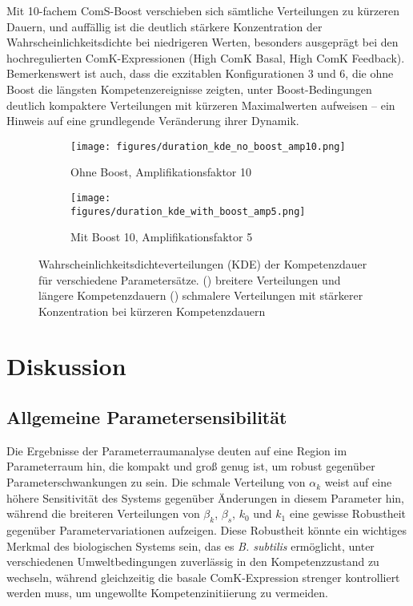 \documentclass[11pt]{article}
\begin{document}
Mit 10-fachem ComS-Boost verschieben sich sämtliche Verteilungen zu kürzeren Dauern, und auffällig ist die deutlich stärkere Konzentration der Wahrscheinlichkeitsdichte bei niedrigeren Werten, besonders ausgeprägt bei den hochregulierten ComK-Expressionen (High ComK Basal, High ComK Feedback). Bemerkenswert ist auch, dass die exzitablen Konfigurationen 3 und 6, die ohne Boost die längsten Kompetenzereignisse zeigten, unter Boost-Bedingungen deutlich kompaktere Verteilungen mit kürzeren Maximalwerten aufweisen – ein Hinweis auf eine grundlegende Veränderung ihrer Dynamik.

\begin{figure}[htbp]
    \centering
    \begin{subfigure}{0.48\textwidth}
        \centering
        \texttt{[image: figures/duration\_kde\_no\_boost\_amp10.png]}
        \caption{Ohne Boost, Amplifikationsfaktor 10}
        \label{fig:kde_no_boost}
    \end{subfigure}
    \hfill %
    \begin{subfigure}{0.48\textwidth}
        \centering
        \texttt{[image: figures/duration\_kde\_with\_boost\_amp5.png]}
        \caption{Mit Boost 10, Amplifikationsfaktor 5}
        \label{fig:kde_with_boost}
    \end{subfigure}
    
    \caption{Wahrscheinlichkeitsdichteverteilungen (KDE) der Kompetenzdauer für verschiedene Parametersätze. () breitere Verteilungen und längere Kompetenzdauern () schmalere Verteilungen mit stärkerer Konzentration bei kürzeren Kompetenzdauern}
    \label{fig:kde_comparison}
\end{figure}

\section{Diskussion}\label{section-discussion}

\subsection{Allgemeine Parametersensibilität}

Die Ergebnisse der Parameterraumanalyse deuten auf eine Region im Parameterraum hin, die kompakt und groß genug ist, um robust gegenüber Parameterschwankungen zu sein. Die schmale Verteilung von $\alpha_k$ weist auf eine höhere Sensitivität des Systems gegenüber Änderungen in diesem Parameter hin, während die breiteren Verteilungen von $\beta_k$, $\beta_s$, $k_0$ und $k_1$ eine gewisse Robustheit gegenüber Parametervariationen aufzeigen. Diese Robustheit könnte ein wichtiges Merkmal des biologischen Systems sein, das es \textit{B. subtilis} ermöglicht, unter verschiedenen Umweltbedingungen zuverlässig in den Kompetenzzustand zu wechseln, während gleichzeitig die basale ComK-Expression strenger kontrolliert werden muss, um ungewollte Kompetenzinitiierung zu vermeiden.
\end{document}
